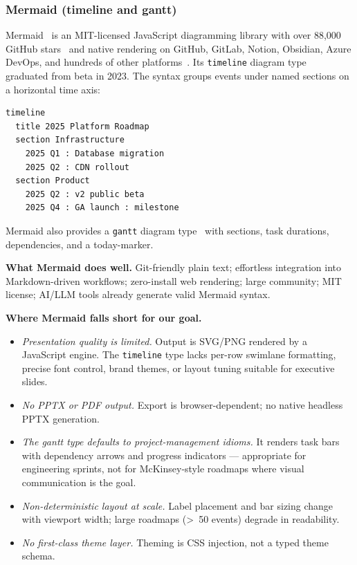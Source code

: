 \subsubsection{Mermaid (timeline and gantt)}

Mermaid~\cite{mermaid2023} is an MIT-licensed JavaScript diagramming library
with over 88{,}000 GitHub stars~\cite{mermaidwiki} and native rendering on
GitHub, GitLab, Notion, Obsidian, Azure DevOps, and hundreds of other
platforms~\cite{mermaid2023}.
Its \texttt{timeline} diagram type~\cite{mermaiddocs2024} graduated from beta
in 2023.
The syntax groups events under named sections on a horizontal time axis:

\begin{Verbatim}[fontsize=\small]
timeline
  title 2025 Platform Roadmap
  section Infrastructure
    2025 Q1 : Database migration
    2025 Q2 : CDN rollout
  section Product
    2025 Q2 : v2 public beta
    2025 Q4 : GA launch : milestone
\end{Verbatim}

\noindent
Mermaid also provides a \texttt{gantt} diagram type~\cite{mermaidgantt2024}
with sections, task durations, dependencies, and a today-marker.

\medskip\noindent
\textbf{What Mermaid does well.}
Git-friendly plain text; effortless integration into Markdown-driven
workflows; zero-install web rendering; large community; MIT license;
AI/LLM tools already generate valid Mermaid syntax.

\medskip\noindent
\textbf{Where Mermaid falls short for our goal.}
\begin{itemize}
  \item \emph{Presentation quality is limited.}
        Output is SVG/PNG rendered by a JavaScript engine. The \texttt{timeline}
        type lacks per-row swimlane formatting, precise font control, brand
        themes, or layout tuning suitable for executive slides.
  \item \emph{No PPTX or PDF output.}
        Export is browser-dependent; no native headless PPTX generation.
  \item \emph{The gantt type defaults to project-management idioms.}
        It renders task bars with dependency arrows and progress indicators ---
        appropriate for engineering sprints, not for McKinsey-style roadmaps
        where visual communication is the goal.
  \item \emph{Non-deterministic layout at scale.}
        Label placement and bar sizing change with viewport width; large
        roadmaps (>~50 events) degrade in readability.
  \item \emph{No first-class theme layer.}
        Theming is CSS injection, not a typed theme schema.
\end{itemize}

